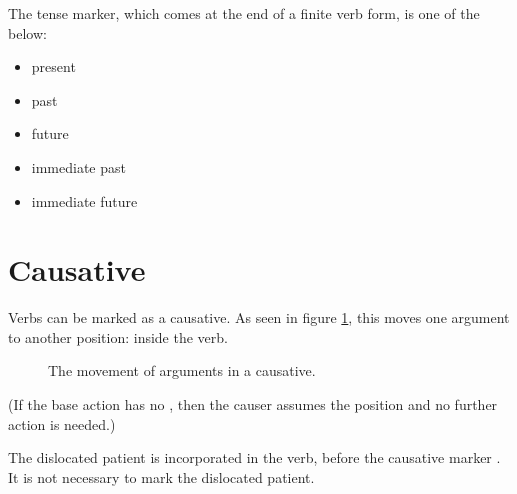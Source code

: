 \documentclass{book}
\begin{document}
The tense marker, which comes at the end of a finite verb form, is one of the below:

\begin{itemize}
    \item {} present
    \item {} past
    \item {} future
    \item {} immediate past
    \item {} immediate future
\end{itemize}

\section{Causative}

Verbs can be marked as a causative. As seen in figure \ref{fig:caus1}, this moves one argument to another position: inside the verb.

\begin{figure}[h]
    \caption{The movement of arguments in a causative. \label{fig:caus1}}
    \centering
\end{figure}

(If the base action has no , then the causer assumes the  position and no further action is needed.)

The dislocated patient is incorporated in the verb, before the causative marker . It is not necessary to mark the dislocated patient.
\end{document}
